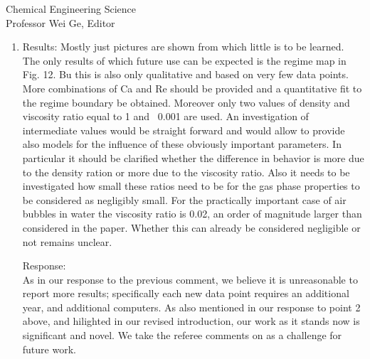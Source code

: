 \documentclass{letter}
\begin{document}
\begin{letter}{
Chemical Engineering Science\\
Professor Wei Ge, Editor\\}
\begin{enumerate}
Finally, we note that in the present study, the computation took more than one year for an experiment with $Re$ = 0.0 and $Ca$ = 1.63 
(M\"{u}ller-Fischer et al. (2008)).
A smaller tolerance would necessitate a larger supported Deformation parameter $D$, which would, in turn, necessitate a 
higher aspect ratio computational domain, increased droplet surface area at break-up, increased number of time steps, and 
higher resolution for representing the drop/bubble at its thinnest point. 
All this translates to the simulation taking over 16 years on a refined mesh.
\\

\par\noindent
\item
\textsf
{Results: Mostly just pictures are shown from which little is to be learned. The only results of which future use can be expected is the regime map in Fig. 12. Bu this is also only qualitative and based on very few data points. More combinations of Ca and Re should be provided and a quantitative fit to the regime boundary be obtained. Moreover only two values of density and viscosity ratio equal to 1 and ~0.001 are used. An investigation of intermediate values would be straight forward and would allow to provide also models for the influence of these obviously important parameters. In particular it should be clarified whether the difference in behavior is more due to the density ration or more due to the viscosity ratio. Also it needs to be investigated how small these ratios need to be for the gas phase properties to be considered as negligibly small. For the practically important case of air bubbles in water the viscosity ratio is 0.02, an order of magnitude larger than considered in the paper. Whether this can already be considered negligible or not remains unclear.}
\vspace{3 mm}

Response: \\
As in our response to the previous comment, we believe it is unreasonable to report more results; specifically each new data point requires an additional year, and additional computers.  As also mentioned in our response to point 2 above, and hilighted in our revised introduction,
our work as it stands now is significant and novel.  We take the referee comments on as a challenge for future work.


\end{enumerate}
\end{letter}
\end{document}
